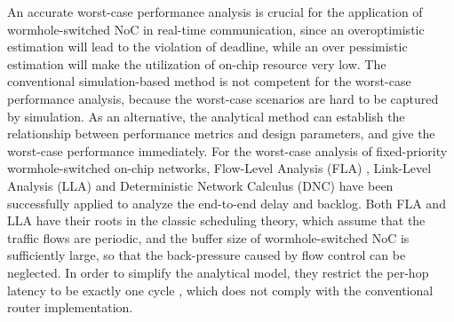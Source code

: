 \documentclass[10pt,journal]{IEEEtran}
\begin{document}
An accurate worst-case performance analysis is crucial for the application of wormhole-switched NoC in real-time communication, since an overoptimistic estimation will lead to the violation of deadline, while an over pessimistic estimation will make the utilization of on-chip resource very low. The conventional simulation-based method is not competent for the worst-case performance analysis, because the worst-case scenarios are hard to be captured by simulation. As an alternative, the analytical method can establish the relationship between performance metrics and design parameters, and give the worst-case performance immediately. For the worst-case analysis of fixed-priority wormhole-switched on-chip networks, Flow-Level Analysis (FLA) \cite{Shi:2008:RCA:1397757.1397996}, Link-Level Analysis (LLA) \cite{73}\cite{189} and Deterministic Network Calculus (DNC) \cite{Qian489900} have been successfully applied to analyze the end-to-end delay and backlog. Both FLA and LLA have their roots in the classic scheduling theory, which assume that the traffic flows are periodic, and the buffer size of wormhole-switched NoC is sufficiently large, so that the back-pressure caused by flow control can be neglected. In order to simplify the analytical model, they restrict the per-hop latency to be exactly one cycle \cite{Shi:2008:RCA:1397757.1397996}\cite{73}\cite{189}, which does not comply with the conventional router implementation.
\end{document}
